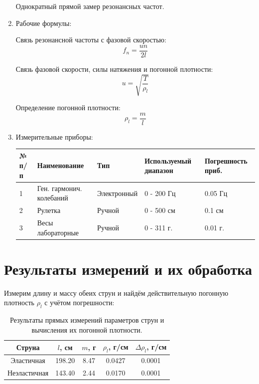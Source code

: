 \documentclass[12pt, a4paper]{article}
\begin{document}
\begin{enumerate}
Однократный прямой замер резонансных частот.

\item Рабочие формулы:

Связь резонансной частоты с фазовой скоростью:
\begin{equation}
f_n = \frac{un}{2l}
\end{equation}

Связь фазовой скорости, силы натяжения и погонной плотности:
\begin{equation}
u = \sqrt{\frac{T}{\rho_l}}
\end{equation}


Определение погонной плотности:
\begin{equation} \label{eq:1}
\rho_l = \frac{m}{l}
\end{equation}

\item Измерительные приборы:

\begin{table}[H]
\centering
\begin{tabular}{|l|l|l|l|l|}
\hline
№ п/п & Наименование & Тип & Используемый диапазон & Погрешность приб.\\
\hline
1 & Ген. гармонич. колебаний & Электронный & 0 - 200 Гц  & 0.05 Гц\\
\hline
2 & Рулетка & Ручной & 0 - 500 см & 0.1 см\\
\hline
3 & Весы лабораторные & Ручной & 0 - 311 г. & 0.01 г.\\
\hline
\end{tabular}
\end{table}

\end{enumerate}
\section{Результаты измерений и их обработка}

Измерим длину и массу обеих струн и найдём действительную погонную плотность $\rho_l$ с учётом погрешности:


\begin{table}[H]
\begin{center}
\begin{tabular}{|c|c|c|c|c|}
\hline 
Струна & $l$, см & $m$, г & $\rho_l$, г/см & $\Delta\rho_l$, г/см \\ 
\hline 
Эластичная & 198.20 & 8.47 & 0.0427 & 0.0001\\ 
\hline 
Неэластичная & 143.40 & 2.44 & 0.0170 & 0.0001\\ 
\hline 

\end{tabular}
\caption{Результаты прямых измерений параметров струн и вычисления их погонной плотности.}
\label{tab:1}
\end{center}
\end{table}
\end{document}
